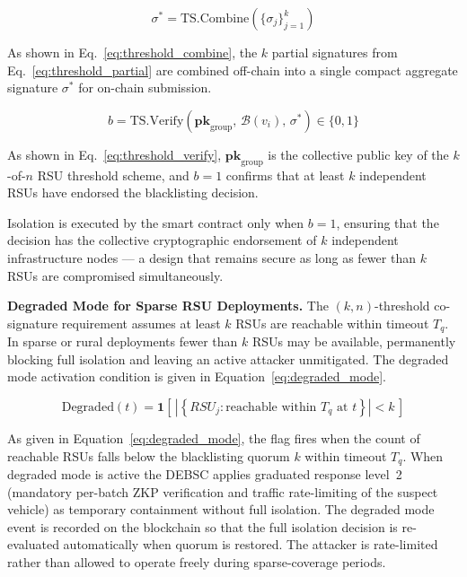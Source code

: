 \documentclass[12pt, a4paper]{report}
\newcommand{\mypar}{\vspace{0.8em}\noindent}
\begin{document}
\begin{equation}
\label{eq:threshold_combine}
\sigma^* = \mathrm{TS.Combine}\!\left(\{\sigma_j\}_{j=1}^{k}\right)
\end{equation}

As shown in Eq.~\eqref{eq:threshold_combine}, the $k$ partial 
signatures from Eq.~\eqref{eq:threshold_partial} are combined 
off-chain into a single compact aggregate signature $\sigma^*$ for 
on-chain submission.

\begin{equation}
\label{eq:threshold_verify}
b = \mathrm{TS.Verify}\!\left(\mathbf{pk}_{\mathrm{group}},\,
\mathcal{B}(v_i),\, \sigma^*\right) \in \{0,1\}
\end{equation}

As shown in Eq.~\eqref{eq:threshold_verify}, $\mathbf{pk}_{\mathrm{group}}$ 
is the collective public key of the $k$-of-$n$ RSU threshold scheme, 
and $b = 1$ confirms that at least $k$ independent RSUs have endorsed 
the blacklisting decision.

\noindent Isolation is executed by the smart contract only when $b = 1$,
ensuring that the decision has the collective cryptographic endorsement of
$k$ independent infrastructure nodes — a design that remains secure as long
as fewer than $k$ RSUs are compromised simultaneously.

\mypar
\textbf{Degraded Mode for Sparse RSU Deployments.}
The $(k,n)$-threshold co-signature requirement assumes at least
$k$ RSUs are reachable within timeout $T_q$. In sparse or rural
deployments fewer than $k$ RSUs may be available, permanently
blocking full isolation and leaving an active attacker
unmitigated. The degraded mode activation condition is given in
Equation~\eqref{eq:degraded_mode}.

\begin{equation}
\label{eq:degraded_mode}
\mathrm{Degraded}(t) =
\mathbf{1}\!\left[\,
\left|\left\{
RSU_j : \text{reachable within } T_q \text{ at } t
\right\}\right| < k
\,\right]
\end{equation}

As given in Equation~\eqref{eq:degraded_mode}, the flag fires
when the count of reachable RSUs falls below the blacklisting
quorum $k$ within timeout $T_q$. When degraded mode is active
the DEBSC applies graduated response level~2 (mandatory
per-batch ZKP verification and traffic rate-limiting of the
suspect vehicle) as temporary containment without full isolation.
The degraded mode event is recorded on the blockchain so that the
full isolation decision is re-evaluated automatically when quorum
is restored. The attacker is rate-limited rather than allowed to
operate freely during sparse-coverage periods.
\end{document}
